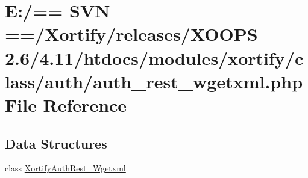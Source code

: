 \hypertarget{auth__rest__wgetxml_8php}{\section{E\-:/== S\-V\-N ==/\-Xortify/releases/\-X\-O\-O\-P\-S 2.6/4.11/htdocs/modules/xortify/class/auth/auth\-\_\-rest\-\_\-wgetxml.php File Reference}
\label{auth__rest__wgetxml_8php}
}
\subsection*{Data Structures}
\begin{DoxyCompactItemize}
\item 
class \hyperlink{class_xortify_auth_rest___wgetxml}{Xortify\-Auth\-Rest\-\_\-\-Wgetxml}
\end{DoxyCompactItemize}
